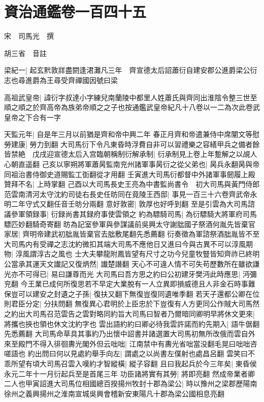 \chapter{資治通鑑卷一百四十五}
宋　司馬光　撰

胡三省　音註

梁紀一|{
	起玄黓敦牂盡閼逢涒灘凡三年　齊宣德太后詔蕭衍自建安郡公進爵梁公衍志也尋進爵為王尋受齊禪國因號曰梁}


高祖武皇帝|{
	諱衍字叔達小字練兒南蘭陵中都里人姓蕭氏與齊同出淮陰令整三世至順之順之於齊高帝為族弟帝順之之子也按通鑑武皇帝紀凡十八卷以一二為次此卷武皇帝之下合有一字}


天監元年|{
	自是年三月以前猶是齊和帝中興二年}
春正月齊和帝遣兼侍中席闡文等慰勞建康|{
	勞力到翻}
大司馬衍下令凡東昏時浮費自非可以習禮樂之容繕甲兵之備者餘皆禁絶　戊戌迎宣德太后入宫臨朝稱制衍解承制|{
	衍承制見上卷上年蹔解之以覘人心朝直遥翻}
己亥以寧朔將軍蕭昺監南兖州諸軍事昺衍之從父弟也|{
	昺兵永翻昺與帝同祖治書侍御史道賜監工衘翻從才用翻}
壬寅進大司馬衍都督中外諸軍事劒履上殿贊拜不名|{
	上時掌翻}
己酉以大司馬長史王亮為中書監尚書令　初大司馬與黃門侍郎范雲南清河太守沈約司徒右長史任昉同在竟陵王西邸|{
	事見一百三十六卷齊武帝永明二年守式又翻任音壬昉分兩翻}
意好敦密|{
	敦厚也好呼到翻}
至是引雲為大司馬諮議參軍領録事|{
	衍録尚書其録府事使雲領之}
約為驃騎司馬|{
	為衍驃騎大將軍府司馬驃匹妙翻騎奇寄翻}
昉為記室參軍與參謀議前吳興太守謝朏國子祭酒何胤先皆棄官家居|{
	齊明帝建武初朏胤皆棄官去朏敷尾翻先悉薦翻}
衍奏徵為軍諮祭酒朏胤皆不至大司馬内有受禪之志沈約微扣其端大司馬不應他日又進曰今與古異不可以淳風期物|{
	淳風謂淳古之風也}
士大夫攀龍附鳳皆望有尺寸之功今兒童牧豎皆知齊祚已終明公當承其運天文䜟記又復炳然|{
	䜟楚譖翻}
天心不可違人情不可失苟歷數所在雖欲謙光亦不可得已|{
	易曰謙尊而光}
大司馬曰吾方思之約曰公初建牙樊沔此時應思|{
	沔彌兖翻}
今王業已成何所復思若不早定大業脫有一人立異即損威德且人非金石時事難保豈可以建安之封遺之子孫|{
	復扶又翻下無復豈復同遺唯季翻}
若天子還都公卿在位則君臣分定|{
	分扶問翻}
無復異心君明於上臣忠於下豈復有人方更同公作賊大司馬然之約出大司馬召范雲告之雲對略同約旨大司馬曰智者乃爾暗同卿明早將休文更來|{
	將攜也挾也領也休文沈約字也}
雲出語約約曰卿必待我雲許諾而約先期入|{
	語牛倨翻先悉薦翻}
大司馬命草具其事約乃出懷中詔書并諸選置大司馬初無所改俄而雲自外來至殿門不得入徘徊夀光閣外但云咄咄|{
	江南禁中有夀光省咄當没翻毛晃曰咄咄咨嗟語也}
約出問曰何以見處約舉手向左|{
	謂處之以尚書左僕射也處昌呂翻}
雲笑曰不乖所望有頃大司馬召雲入嘆約才智縱橫|{
	縱子容翻}
且曰我起兵於今三年矣|{
	東昏侯永元二年十一月衍起兵至是首尾三年}
功臣諸將實有其勞|{
	將即亮翻}
然成帝業者卿二人也甲寅詔進大司馬位相國總百揆揚州牧封十郡為梁公|{
	時以豫州之梁郡歷陽南徐州之義興揚州之淮南宣城吳興會稽新安東陽凡十郡為梁公國相息亮翻}
